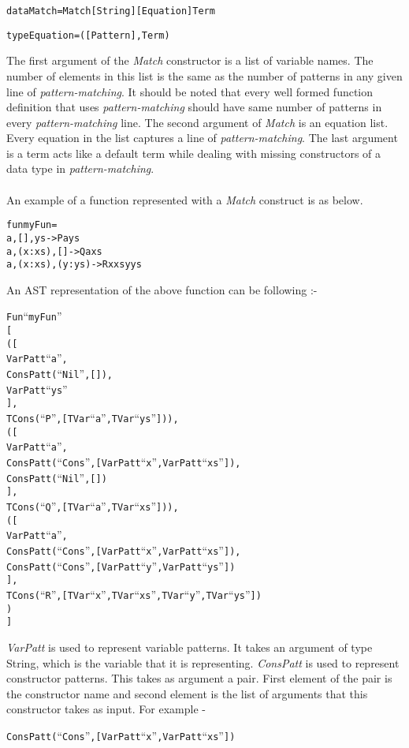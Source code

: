 \documentclass[11pt]{article}
\begin{document}
\begin{alltt}
data Match    = Match [String] [Equation] Term 

type Equation = ([Pattern],Term)
\end{alltt}
The first argument of the {\em Match} constructor is a list of variable names. The number of elements in this list is the same as the number of patterns in any given line of {\em pattern-matching}. It should be noted that every well formed function definition that uses {\em pattern-matching} should have same number of patterns in every {\em pattern-matching} line. 
The second argument of {\em Match} is an equation list. Every equation in the list captures a line of {\em pattern-matching}. 
The last argument is a term acts like a default term while dealing with missing constructors of a data type in {\em pattern-matching}.
~~\\~~\\ 
An example of a function represented with a {\em Match} construct is as below. 
\begin{alltt}
fun myFun =
    a,[],     ys     -> P a ys  
    a,(x:xs), []     -> Q a xs 
    a,(x:xs), (y:ys) -> R x xs y ys 
\end{alltt}
An AST representation of the above function can be following :- 
\begin{alltt}
    Fun ``myFun''
            [
             ([
               VarPatt ``a'',
               ConsPatt (``Nil'',[]),
               VarPatt ``ys''
              ],
                    TCons (``P'',[TVar ``a'',TVar ``ys''])),
             ([
               VarPatt ``a'',
               ConsPatt (``Cons'',[VarPatt ``x'',VarPatt ``xs'']),
               ConsPatt (``Nil'',[])
               ],
                    TCons (``Q'',[TVar ``a'',TVar ``xs''])),
             ([
               VarPatt ``a'',
               ConsPatt (``Cons'',[VarPatt ``x'',VarPatt ``xs'']),
               ConsPatt (``Cons'',[VarPatt ``y'',VarPatt ``ys''])
              ],
                    TCons (``R'',[TVar ``x'',TVar ``xs'',TVar ``y'',TVar ``ys''])
             )
            ]           
\end{alltt}
{\em VarPatt} is used to represent variable patterns. It takes an argument of type String, which is the variable that it is representing.
{\em ConsPatt} is used to represent constructor patterns. This takes as argument a pair. First element of the pair is the constructor name and second element is the list of arguments that this constructor takes as input. For example -
\begin{alltt}
ConsPatt (``Cons'',[VarPatt ``x'',VarPatt ``xs''])
\end{alltt}
\end{document}
